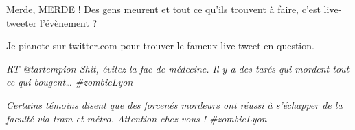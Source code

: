 Merde, MERDE ! Des gens meurent et tout ce qu'ils trouvent à faire, c'est live-tweeter l'évènement ?

Je pianote sur twitter.com pour trouver le fameux live-tweet en question.

\begin{center}
\textit{RT @tartempion Shit, évitez la fac de médecine. Il y a des tarés qui mordent tout ce qui bougent… \#{}zombieLyon}
\end{center}

\begin{center}
\textit{Certains témoins disent que des forcenés mordeurs ont réussi à s'échapper de la faculté via tram et métro. Attention chez vous ! \#{}zombieLyon}
\end{center}